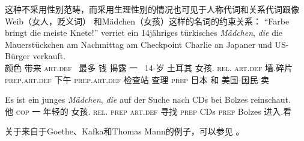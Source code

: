\zl
这种不采用性别范畴，而采用生理性别的情况也可见于人称代词和关系代词跟像Weib（女人，贬义词） 和Mädchen（女孩）这样的名词的约束关系：
\eal
\ex 
\gll "`Farbe bringt die meiste Knete!"' verriet ein 14jähriges türkisches \emph{Mädchen}, \emph{die} die Mauerstückchen am      Nachmittag am Checkpoint Charlie an Japaner und US-Bürger verkauft.\footnotemark\\
颜色 带来 \textsc{art}.\textsc{def}~ 最多 钱 揭露 一~ 14-岁  土耳其 女孩.\neu{} \textsc{rel}.\fem{} \textsc{art}.\textsc{def} 墙.碎片
\textsc{prep}.\textsc{art}.\textsc{def} 下午 \textsc{prep}.\textsc{art}.\textsc{def} 检查站 查理 \textsc{prep} 日本 和 美国-国民 卖\\  
\ex 
{\raggedright
\gll Es ist ein junges {\em Mädchen\/}, {\em die\/} auf der Suche nach CDs bei Bolzes reinschaut.\footnotemark\\
	 他 \textsc{cop} 一 年轻的 女孩.\neu{} \textsc{rel}.\fem{} \textsc{prep} \textsc{art}.\textsc{def} 寻找 \textsc{prep} CDs \textsc{prep} Bolzes 进入.看\\
\par}
\zl
关于来自于Goethe、Kafka和Thomas Mann的例子，可以参见 。

